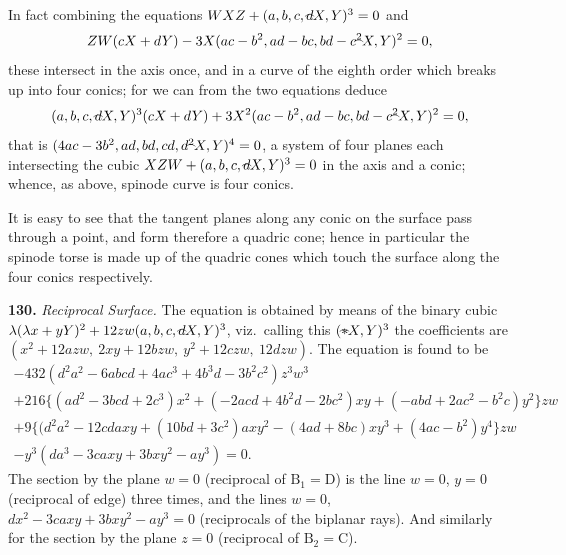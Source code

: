 \documentclass[11pt,a4paper]{article}
\theoremstyle{definition}
\begin{document}
In fact combining the equations $WXZ+(a,b,c,d\!\hbox{\hspace{-0.5em}}\raisebox{0.3ex}{$\scriptstyle\frown$}\!X,Y)^3=0$ and
\[
ZW(cX+dY)-3X(ac-b^2,ad-bc,bd-c^2\!\hbox{\hspace{-0.5em}}\raisebox{0.3ex}{$\scriptstyle\frown$}\!X,Y)^2=0,
\]
these intersect in the axis once, and in a curve of the eighth order which breaks up into four conics; for we can from the two equations deduce
\[
(a,b,c,d\!\hbox{\hspace{-0.5em}}\raisebox{0.3ex}{$\scriptstyle\frown$}\!X,Y)^3(cX+dY)+3X^2(ac-b^2,ad-bc,bd-c^2\!\hbox{\hspace{-0.5em}}\raisebox{0.3ex}{$\scriptstyle\frown$}\!X,Y)^2=0,
\]
that is $(4ac-3b^2,ad,bd,cd,d^2\!\hbox{\hspace{-0.5em}}\raisebox{0.3ex}{$\scriptstyle\frown$}\!X,Y)^4=0$, a system of four planes each intersecting the cubic $XZW+(a,b,c,d\!\hbox{\hspace{-0.5em}}\raisebox{0.3ex}{$\scriptstyle\frown$}\!X,Y)^3=0$ in the axis and a conic; whence, as above, spinode curve is four conics.

It is easy to see that the tangent planes along any conic on the surface pass through a point, and form therefore a quadric cone; hence in particular the spinode torse is made up of the quadric cones which touch the surface along the four conics respectively.

\setcounter{page}{424}

\noindent\textbf{130.} \textit{Reciprocal Surface.} The equation is obtained by means of the binary cubic $\lambda(\lambda x+yY)^2 + 12zw(a,b,c,d\!\hbox{\hspace{-0.5em}}\raisebox{0.3ex}{$\scriptstyle\frown$}\!X,Y)^3$, viz.\ calling this $({*}\!\hbox{\hspace{-0.5em}}\raisebox{0.3ex}{$\scriptstyle\frown$}\!X,Y)^3$ the coefficients are $(x^2+12azw,\ 2xy+12bzw,\ y^2+12czw,\ 12dzw)$. The equation is found to be
\begin{multline*}
-432(d^2a^2-6abcd+4ac^3+4b^3d-3b^2c^2)z^3w^3 \\
+216\{(ad^2-3bcd+2c^3)x^2+(-2acd+4b^2d-2bc^2)xy+(-abd+2ac^2-b^2c)y^2\}zw \\
+9\{(d^2a^2-12cdaxy+(10bd+3c^2)axy^2-(4ad+8bc)xy^3+(4ac-b^2)y^4\}zw \\
-y^3(da^3-3caxy+3bxy^2-ay^3)=0.
\end{multline*}
The section by the plane $w=0$ (reciprocal of $\mathrm{B}_1=\mathrm{D}$) is the line $w=0$, $y=0$ (reciprocal of edge) three times, and the lines $w=0$, $dx^2-3caxy+3bxy^2-ay^3=0$ (reciprocals of the biplanar rays). And similarly for the section by the plane $z=0$ (reciprocal of $\mathrm{B}_2=\mathrm{C}$).
\end{document}
